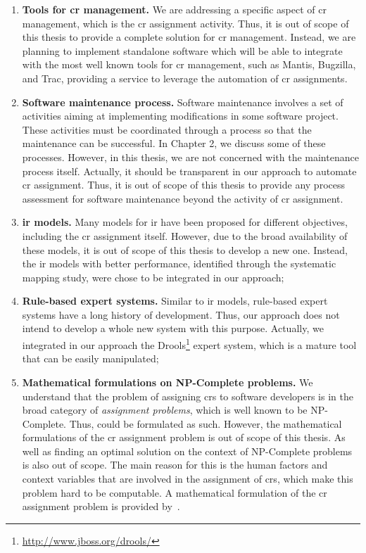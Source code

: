 \begin{enumerate}
  \item \textbf{Tools for \ac{cr} management.} We are addressing
  a specific aspect of \ac{cr} management, which is the \ac{cr} assignment
  activity. Thus, it is out of scope of this thesis to provide a
  complete solution for \ac{cr} management. Instead, we are planning to
  implement standalone software which will be able to integrate with the
  most well known tools for \ac{cr} management, such as Mantis, Bugzilla, and
  Trac, providing a service to leverage the automation of \ac{cr}
  assignments.

  \item \textbf{Software maintenance process.} Software maintenance involves
  a set of activities aiming at implementing modifications in some software
  project. These activities must be coordinated through a process so that the
  maintenance can be successful. In Chapter 2, we discuss some of
  these processes. However, in this thesis, we are not concerned with the
  maintenance process itself. Actually, it should be transparent in our approach
  to automate \ac{cr} assignment. Thus, it is out of scope of this
  thesis to provide any process assessment for software maintenance beyond the
  activity of \ac{cr} assignment.

  \item \textbf{\ac{ir} models.} Many models for \ac{ir} have been proposed for
  different objectives, including the \ac{cr} assignment itself. However, due to
  the broad availability of these models, it is out of scope of this thesis to
  develop a new one. Instead, the \ac{ir} models with better performance,
  identified through the systematic mapping study, were chose to be
  integrated in our approach;

  \item \textbf{Rule-based expert systems.} Similar to \ac{ir} models,
  rule-based expert systems have a long history of development. Thus, our
  approach does not intend to develop a whole new system with this purpose.
  Actually, we integrated in our approach the
  Drools\footnote{\url{http://www.jboss.org/drools/}} expert system, which is a
  mature tool that can be easily manipulated;

  \item \textbf{Mathematical formulations on NP-Complete problems.} We
  understand that the problem of assigning \acp{cr} to software developers is in
  the broad category of \emph{assignment problems}, which is well known to be
  NP-Complete. Thus, could be formulated as such. However, the mathematical
  formulations of the \ac{cr} assignment problem is out of scope of this thesis.
  As well as finding an optimal solution on the context of NP-Complete problems
  is also out of scope. The main reason for this is the human factors and
  context variables that are involved in the assignment of \acp{cr}, which
  make this problem hard to be computable. A mathematical formulation of the
  \ac{cr} assignment problem is provided by~\citet{Rahman2009}.
\end{enumerate}


